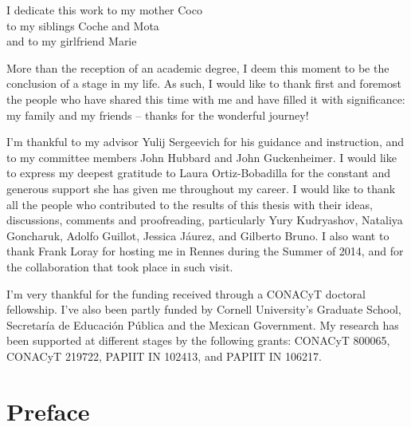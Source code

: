 \documentclass[phd,tocprelim]{cornell}
\begin{document}
\cleardoublepage{}
\begin{dedication}
I dedicate this work %
to my mother Coco \\
to my siblings Coche and Mota \\
and to my girlfriend Marie
\end{dedication}


\cleardoublepage{}
\begin{acknowledgements}
More than the reception of an academic degree, I deem this moment to be the conclusion of a stage in my life. As such, I would like to thank first and foremost the people who have shared this time with me and have filled it with significance: my family and my friends -- thanks for the wonderful journey!

\bigskip
I'm thankful to my advisor Yulij Sergeevich for his guidance and instruction, and to my committee members John Hubbard and John Guckenheimer.
% 
I would like to express my deepest gratitude to Laura Ortiz-Bobadilla for the constant and generous support she has given me throughout my career.
% 
I would like to thank all the people who contributed to the results of this thesis with their ideas, discussions, comments and proofreading, particularly Yury Kudryashov, Nataliya Goncharuk, Adolfo Guillot, Jessica Jáurez, and Gilberto Bruno.
% 
I also want to thank Frank Loray for hosting me in Rennes during the Summer of 2014, and for the collaboration that took place in such visit. 

\bigskip
I'm very thankful for the funding received through a CONACyT doctoral fellowship. I've also been partly funded by Cornell University's Graduate School, Secretaría de Educación Pública and the Mexican Government. My research has been supported at different stages by the following grants: CONACyT 800065, CONACyT 219722, PAPIIT IN 102413, and PAPIIT IN 106217.
\end{acknowledgements}


\hypersetup{linkcolor=black} %
\cleardoublepage{}
\contentspage
\hypersetup{linkcolor=red}


\cleardoublepage{}
{}
\chapter*{Preface}
\end{document}
